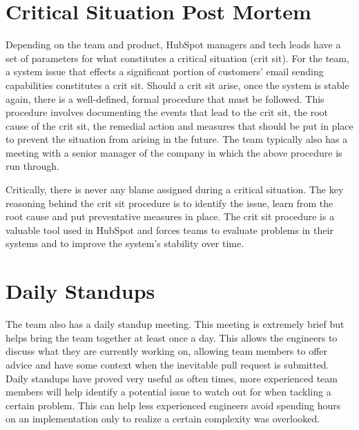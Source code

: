 \section{Critical Situation Post Mortem}
Depending on the team and product, HubSpot managers and tech leads have a set of parameters for what constitutes a critical situation (crit sit). For the \team{} team, a system issue that effects a significant portion of customers' email sending capabilities constitutes a crit sit. Should a crit sit arise, once the system is stable again, there is a well-defined, formal procedure that must be followed. This procedure involves documenting the events that lead to the crit sit, the root cause of the crit sit, the remedial action and measures that should be put in place to prevent the situation from arising in the future. The team typically also has a meeting with a senior manager of the company in which the above procedure is run through.

Critically, there is never any blame assigned during a critical situation. The key reasoning behind the crit sit procedure is to identify the issue, learn from the root cause and put preventative measures in place. The crit sit procedure is a valuable tool used in HubSpot and forces teams to evaluate problems in their systems and to improve the system's stability over time.

\section{Daily Standups}
The \team{} team also has a daily standup meeting. This meeting is extremely brief but helps bring the team together at least once a day. This allows the engineers to discuss what they are currently working on, allowing team members to offer advice and have some context when the inevitable pull request is submitted. Daily standups have proved very useful as often times, more experienced team members will help identify a potential issue to watch out for when tackling a certain problem. This can help less experienced engineers avoid spending hours on an implementation only to realize a certain complexity was overlooked. 
